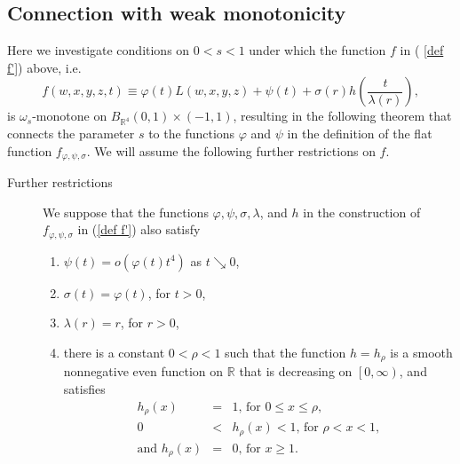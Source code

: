 \documentclass{amsart}
\theoremstyle{plain}
\numberwithin{equation}{section}
\begin{document}
\subsection{Connection with weak monotonicity}

Here we investigate conditions on $0<s<1$ under which the function $f$ in (%
\ref{def f'}) above, i.e.%
\begin{equation*}
f\left( w,x,y,z,t\right) \equiv \varphi \left( t\right) L\left(
w,x,y,z\right) +\psi \left( t\right) +\sigma \left( r\right) h\left( \frac{t%
}{\lambda \left( r\right) }\right) ,
\end{equation*}%
is $\omega _{s}$-monotone on $B_{\mathbb{R}^{4}}\left( 0,1\right) \times
\left( -1,1\right) $, resulting in the following theorem that connects the
parameter $s$ to the functions $\varphi $ and $\psi $ in the definition of
the flat function $f_{\varphi ,\psi ,\sigma }$. We will assume the following
further restrictions on $f$.

\begin{description}
\item[Further restrictions] We suppose that the functions $\varphi ,\psi
,\sigma, \lambda $, and $h$ in the construction of $f_{\varphi ,\psi ,\sigma }$ in (\ref{def
	f'}) also satisfy

\begin{enumerate}
\item $\psi \left( t\right) =o\left( \varphi \left( t\right) t^{4}\right) $
as $t\searrow 0$,

\item $\sigma \left( t\right) =\varphi \left( t\right) $, for $t>0$,

\item $\lambda \left( r\right) =r$, for $r>0$,

\item there is a constant $0<\rho <1$ such that the function $h=h_{\rho }$
is a smooth nonnegative even function on $\mathbb{R}$ that is decreasing on $%
\left[ 0,\infty \right) $, and satisfies%
\begin{eqnarray*}
h_{\rho }\left( x\right) &=&1\text{, for }0\leq x\leq \rho , \\
0 &<&h_{\rho }\left( x\right) <1\text{, for }\rho <x<1, \\
\text{and }h_{\rho }\left( x\right) &=&0\text{, for }x\geq 1.
\end{eqnarray*}
\end{enumerate}
\end{description}
\end{document}
